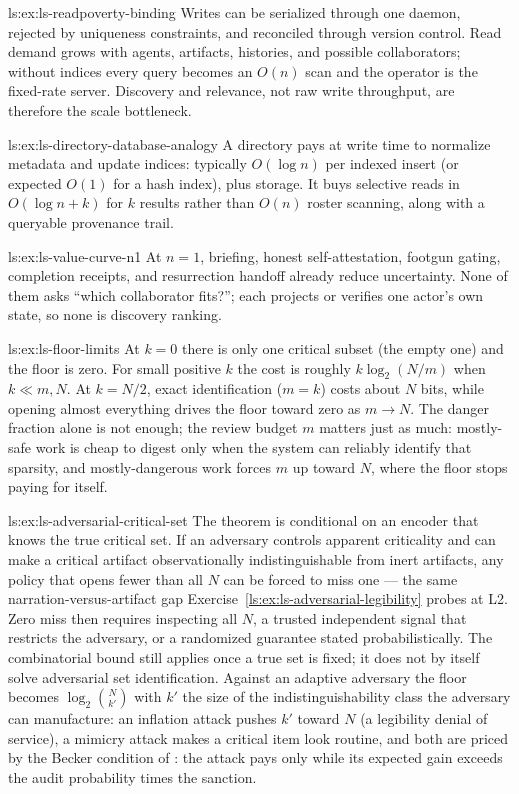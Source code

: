 \begin{pdSolution}{ls:ex:ls-readpoverty-binding}
Writes can be serialized through one daemon, rejected by uniqueness constraints, and reconciled through version control. Read demand grows with agents, artifacts, histories, and possible collaborators; without indices every query becomes an $O(n)$ scan and the operator is the fixed-rate server. Discovery and relevance, not raw write throughput, are therefore the scale bottleneck.
\end{pdSolution}
\begin{pdSolution}{ls:ex:ls-directory-database-analogy}
A directory pays at write time to normalize metadata and update indices: typically $O(\log n)$ per indexed insert (or expected $O(1)$ for a hash index), plus storage. It buys selective reads in $O(\log n+k)$ for $k$ results rather than $O(n)$ roster scanning, along with a queryable provenance trail.
\end{pdSolution}
\begin{pdSolution}{ls:ex:ls-value-curve-n1}
At $n{=}1$, briefing, honest self-attestation, footgun gating, completion receipts, and resurrection handoff already reduce uncertainty. None of them asks ``which collaborator fits?''; each projects or verifies one actor's own state, so none is discovery ranking.
\end{pdSolution}
\begin{pdSolution}{ls:ex:ls-floor-limits}
At $k=0$ there is only one critical subset (the empty one) and the floor is zero. For small positive $k$ the cost is roughly $k\log_2(N/m)$ when $k\ll m,N$. At $k=N/2$, exact identification ($m=k$) costs about $N$ bits, while opening almost everything drives the floor toward zero as $m\to N$. The danger fraction alone is not enough; the review budget $m$ matters just as much: mostly-safe work is cheap to digest only when the system can reliably identify that sparsity, and mostly-dangerous work forces $m$ up toward $N$, where the floor stops paying for itself.
\end{pdSolution}
\begin{pdSolution}{ls:ex:ls-adversarial-critical-set}
The theorem is conditional on an encoder that knows the true critical set. If an adversary controls apparent criticality and can make a critical artifact observationally indistinguishable from inert artifacts, any policy that opens fewer than all $N$ can be forced to miss one --- the same narration-versus-artifact gap Exercise~\ref{ls:ex:ls-adversarial-legibility} probes at L2. Zero miss then requires inspecting all $N$, a trusted independent signal that restricts the adversary, or a randomized guarantee stated probabilistically. The combinatorial bound still applies once a true set is fixed; it does not by itself solve adversarial set identification. Against an adaptive adversary the floor becomes $\log_2\binom{N}{k'}$ with $k'$ the size of the indistinguishability class the adversary can manufacture: an inflation attack pushes $k'$ toward $N$ (a legibility denial of service), a mimicry attack makes a critical item look routine, and both are priced by the Becker condition of : the attack pays only while its expected gain exceeds the audit probability times the sanction.
\end{pdSolution}
